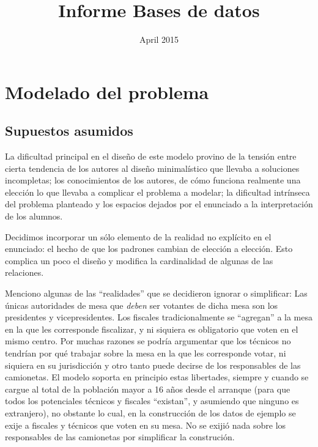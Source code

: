 \documentclass{article}
\title{Informe Bases de datos}
\date{April 2015}
\begin{document}


\begin{titlepage}
\maketitle
\thispagestyle{empty}
\end{titlepage} 

\tableofcontents

\section{Modelado del problema}
\subsection{Supuestos asumidos}
La dificultad principal en el diseño de este modelo provino de la tensión entre cierta tendencia de
los autores al diseño minimalístico que llevaba a soluciones incompletas; los conocimientos de los
autores, de cómo funciona realmente una elección lo que llevaba a complicar el problema a modelar;
la dificultad intrínseca del problema planteado y los espacios dejados por el enunciado a la
interpretación de los alumnos.

Decidimos incorporar un sólo elemento de la realidad no explícito en el enunciado: el hecho de que
los padrones cambian de elección a elección.  Esto complica un poco el diseño y modifica la
cardinalidad de algunas de las relaciones.

Menciono algunas de las ``realidades'' que se decidieron ignorar o simplificar: Las únicas
autoridades de mesa que \emph{deben} ser votantes de dicha mesa son los presidentes y
vicepresidentes.  Los fiscales tradicionalmente se ``agregan'' a la mesa en la que les corresponde
fiscalizar, y ni siquiera es obligatorio que voten en el mismo centro\footnotemark.  Por muchas
razones se podría argumentar que los técnicos no tendrían por qué trabajar sobre la mesa en la que
les corresponde votar, ni siquiera en su jurisdicción y otro tanto puede decirse de los responsables
de las camionetas.  El modelo soporta en principio estas libertades, siempre y cuando se cargue al
total de la población mayor a 16 años desde el arranque (para que todos los potenciales técnicos y
fiscales ``existan'', y asumiendo que ninguno es extranjero), no obstante lo cual, en la
construcción de los datos de ejemplo se exije a fiscales y técnicos que voten en su mesa.  No se
exijió nada sobre los responsables de las camionetas por simplificar la construción.
\end{document}
